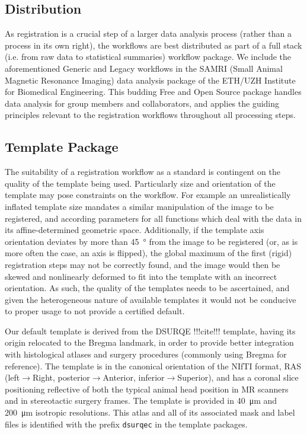 \subsection{Distribution}

As registration is a crucial step of a larger data analysis process (rather than a process in its own right), the workflows are best distributed as part of a full stack (i.e. from raw data to statistical summaries) workflow package.
We include the aforementioned Generic and Legacy workflows in the SAMRI (Small Animal Magnetic Resonance Imaging) data analysis package \cite{samri} of the ETH/UZH Institute for Biomedical Engineering.
This budding Free and Open Source package handles data analysis for group members and collaborators, and applies the guiding principles relevant to the registration workflows throughout all processing steps.

\subsection{Template Package}

The suitability of a registration workflow as a standard is contingent on the quality of the template being used.
Particularly size and orientation of the template may pose constraints on the workflow.
For example an unrealistically inflated template size mandates a similar manipulation of the image to be registered, and according parameters for all functions which deal with the data in its affine-determined geometric space.
Additionally, if the template axis orientation deviates by more than \SI{45}{\degree} from the image to be registered (or, as is more often the case, an axis is flipped), the global maximum of the first (rigid) registration steps may not be correctly found, and the image would then be skewed and nonlinearly deformed to fit into the template with an incorrect orientation.
As such, the quality of the templates needs to be ascertained, and given the heterogeneous nature of available templates it would not be conducive to proper usage to not provide a certified default.

Our default template is derived from the DSURQE !!!cite!!! template, having its origin relocated to the Bregma landmark, in order to provide better integration with histological atlases and surgery procedures (commonly using Bregma for reference).
The template is in the canonical orientation of the NIfTI format, RAS (left$\rightarrow$Right, posterior$\rightarrow$Anterior, inferior$\rightarrow$Superior), and has a coronal slice positioning reflective of both the typical animal head position in MR scanners and in stereotactic surgery frames.
The template is provided in \SI{40}{\micro\meter} and \SI{200}{\micro\meter} isotropic resolutions.
This atlas and all of its associated mask and label files is identified with the prefix \textcolor{mg}{\texttt{dsurqec}} in the template packages.

